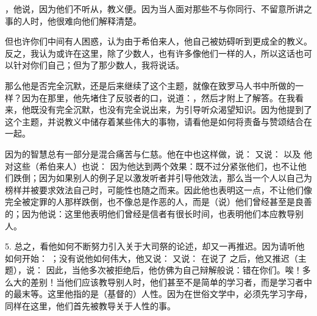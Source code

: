 ，他说，因为他们不听从，教义便。因为当人面对那些不与你同行、不留意所讲之事的人时，他很难向他们解释清楚。\par

但也许你们中间有人困惑，认为由于希伯来人，他自己被妨碍听到更成全的教义。反之，我认为或许在这里，除了少数人，也有许多像他们一样的人，所以这话也可以针对你们自己；但为了那少数人，我将说话。\par

那么他是否完全沉默，还是后来继续了这个主题，就像在致罗马人书中所做的一样？因为在那里，他先堵住了反驳者的口，说道：，然后才附上了解答。在我看来，他既没有完全沉默，也没有完全说出来，为引导听众渴望知识。因为他提到了这个主题，并说教义中储存着某些伟大的事物，请看他是如何将责备与赞颂结合在一起。\par

因为的智慧总有一部分是混合痛苦与仁慈。他在中也这样做，说： 又说： 以及 他对这些（希伯来人）也说： 因为他达到两个效果：既不过分紧张他们，也不让他们跌倒；因为如果别人的例子足以激发听者并引导他效法，那么当一个人以自己为榜样并被要求效法自己时，可能性也随之而来。因此他也表明这一点，不让他们像完全被定罪的人那样跌倒，也不像总是作恶的人，而是（说）他们曾经甚至是良善的；因为他说：这里他表明他们曾经是信者有很长时间，也表明他们本应教导别人。\par

5. 总之，看他如何不断努力引入关于大司祭的论述，却又一再推迟。因为请听他如何开始： ；没有说他如何伟大，他又说： 又说： 在说了 之后，他又推迟（主题），说： 因此，当他多次被拒绝后，他仿佛为自己辩解般说：错在你们。唉！多么大的差别！当他们应该教导别人时，他们甚至不是简单的学习者，而是学习者中的最末等。这里他指的是（基督的）人性。因为在世俗文学中，必须先学习字母，同样在这里，他们首先被教导关于人性的事。\par

